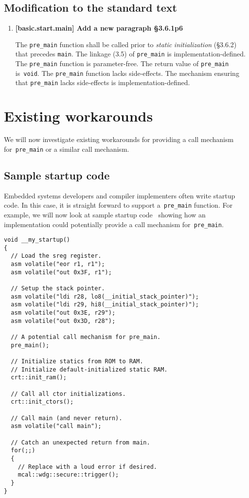 \documentclass[11pt]{article}
\begin{document}
\subsection*{Modification to the standard text}
\begin{enumerate}

  \item \textbf{[basic.start.main] Add a new paragraph \S3.6.1p6}

  The \lstinline{pre_main} function shall be called prior to
  \emph{static} \emph{initialization} (\S3.6.2)
  that precedes \lstinline{main}.
  The linkage (3.5) of \lstinline{pre_main} is implementation-defined.
  The \lstinline{pre_main} function is parameter-free.
  The return value of \lstinline{pre_main} is~\lstinline{void}.
  The \lstinline{pre_main} function lacks side-effects.
  The mechanism ensuring that \lstinline{pre_main} lacks
  side-effects is implementation-defined.

\end{enumerate}

\section{Existing workarounds}

We will now investigate existing workarounds for providing
a call mechanism for~\lstinline{pre_main} or a similar
call mechanism.

\subsection*{Sample startup code}

Embedded systems developers and compiler implementers often
write startup code. In this case, it is straight forward
to support a~\lstinline{pre_main} function.
For example, we will now look at sample startup
code~\cite{bib:kormanyos2013,bib:kormanyosgit2015}
showing how an implementation could potentially provide
a call mechanism for~\lstinline{pre_main}.
  
\begin{lstlisting}
void __my_startup()
{
  // Load the sreg register.
  asm volatile("eor r1, r1");
  asm volatile("out 0x3F, r1");

  // Setup the stack pointer.
  asm volatile("ldi r28, lo8(__initial_stack_pointer)");
  asm volatile("ldi r29, hi8(__initial_stack_pointer)");
  asm volatile("out 0x3E, r29");
  asm volatile("out 0x3D, r28");

  // A potential call mechanism for pre_main.
  pre_main();

  // Initialize statics from ROM to RAM.
  // Initialize default-initialized static RAM.
  crt::init_ram();

  // Call all ctor initializations.
  crt::init_ctors();

  // Call main (and never return).
  asm volatile("call main");

  // Catch an unexpected return from main.
  for(;;)
  {
    // Replace with a loud error if desired.
    mcal::wdg::secure::trigger();
  }
}
\end{lstlisting}
  
\end{document}

